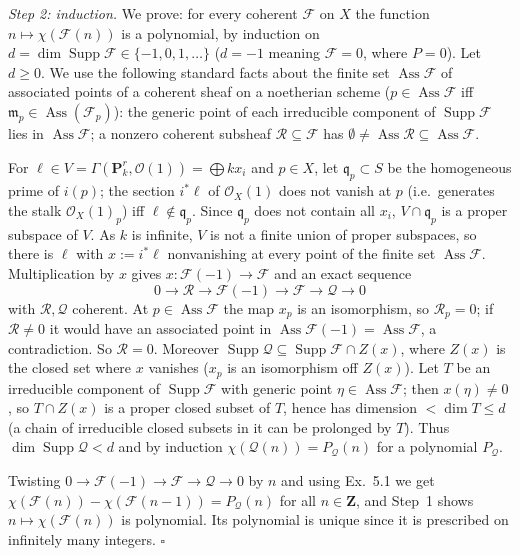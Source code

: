 \documentclass[11pt]{article}
\begin{document}
\emph{Step 2: induction.} We prove: for every coherent $\mathcal F$ on $X$ the function $n\mapsto\chi(\mathcal F(n))$ is a polynomial, by induction on $d=\dim\operatorname{Supp}\mathcal F\in\{-1,0,1,\dots\}$ ($d=-1$ meaning $\mathcal F=0$, where $P=0$). Let $d\ge0$. We use the following standard facts about the finite set $\operatorname{Ass}\mathcal F$ of associated points of a coherent sheaf on a noetherian scheme ($p\in\operatorname{Ass}\mathcal F$ iff $\mathfrak m_p\in\operatorname{Ass}(\mathcal F_p)$): the generic point of each irreducible component of $\operatorname{Supp}\mathcal F$ lies in $\operatorname{Ass}\mathcal F$; a nonzero coherent subsheaf $\mathcal R\subseteq\mathcal F$ has $\emptyset\ne\operatorname{Ass}\mathcal R\subseteq\operatorname{Ass}\mathcal F$.

For $\ell\in V=\Gamma(\mathbf P^r_k,\mathcal O(1))=\bigoplus kx_i$ and $p\in X$, let $\mathfrak q_p\subset S$ be the homogeneous prime of $i(p)$; the section $i^*\ell$ of $\mathcal O_X(1)$ does not vanish at $p$ (i.e.\ generates the stalk $\mathcal O_X(1)_p$) iff $\ell\notin\mathfrak q_p$. Since $\mathfrak q_p$ does not contain all $x_i$, $V\cap\mathfrak q_p$ is a proper subspace of $V$. As $k$ is infinite, $V$ is not a finite union of proper subspaces, so there is $\ell$ with $x:=i^*\ell$ nonvanishing at every point of the finite set $\operatorname{Ass}\mathcal F$. Multiplication by $x$ gives $x\colon\mathcal F(-1)\to\mathcal F$ and an exact sequence
\[
0\to\mathcal R\to\mathcal F(-1)\to\mathcal F\to\mathcal Q\to0
\]
with $\mathcal R,\mathcal Q$ coherent. At $p\in\operatorname{Ass}\mathcal F$ the map $x_p$ is an isomorphism, so $\mathcal R_p=0$; if $\mathcal R\neq0$ it would have an associated point in $\operatorname{Ass}\mathcal F(-1)=\operatorname{Ass}\mathcal F$, a contradiction. So $\mathcal R=0$. Moreover $\operatorname{Supp}\mathcal Q\subseteq\operatorname{Supp}\mathcal F\cap Z(x)$, where $Z(x)$ is the closed set where $x$ vanishes ($x_p$ is an isomorphism off $Z(x)$). Let $T$ be an irreducible component of $\operatorname{Supp}\mathcal F$ with generic point $\eta\in\operatorname{Ass}\mathcal F$; then $x(\eta)\ne0$, so $T\cap Z(x)$ is a proper closed subset of $T$, hence has dimension $<\dim T\le d$ (a chain of irreducible closed subsets in it can be prolonged by $T$). Thus $\dim\operatorname{Supp}\mathcal Q<d$ and by induction $\chi(\mathcal Q(n))=P_{\mathcal Q}(n)$ for a polynomial $P_{\mathcal Q}$.

Twisting $0\to\mathcal F(-1)\to\mathcal F\to\mathcal Q\to0$ by $n$ and using Ex.~5.1 we get $\chi(\mathcal F(n))-\chi(\mathcal F(n-1))=P_{\mathcal Q}(n)$ for all $n\in\mathbf Z$, and Step~1 shows $n\mapsto\chi(\mathcal F(n))$ is polynomial. Its polynomial is unique since it is prescribed on infinitely many integers. \hfill$\square$
\end{document}
